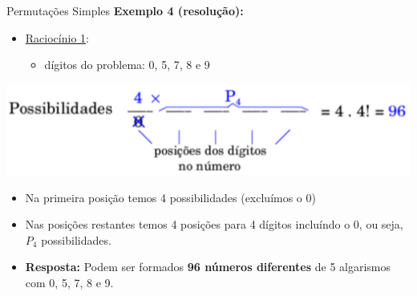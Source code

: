 \documentclass[aspectratio=169]{beamer}
\begin{document}
\begin{frame}{Permutações Simples}
    \textbf{Exemplo 4 (resolução):}

    \vspace{3mm}

    \begin{itemize}
        \item[] \underline{Raciocínio 1}: 
        \begin{itemize}
            \item dígitos do problema: 0, 5, 7, 8 e 9
        \end{itemize}
    \end{itemize}

    \pause

    \begin{center}
        \includegraphics[width=0.5\linewidth]{figs/Exemplo4.png}
    \end{center}
    
    \pause

    \begin{itemize}
        \item Na primeira posição temos 4 possibilidades (excluímos o 0)
        \item Nas posições restantes temos 4 posições para 4 dígitos incluíndo o 0, ou seja, $P_4$ possibilidades.
    \end{itemize}

    \pause
    \vspace*{3mm}

    \begin{itemize}
        \item[] \textbf{Resposta:} Podem ser formados \textbf{96 números diferentes} de 5 algarismos com 0, 5, 7, 8 e 9.
    \end{itemize}
\end{frame}
\end{document}
